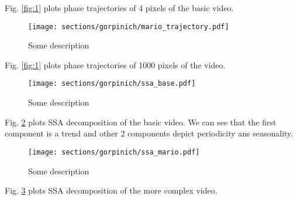 \documentclass[../../main.tex]{subfiles}
\begin{document}
Fig. \ref{fig:1} plots phase trajectories of 4 pixels of the basic video.

\begin{figure}[h!]
\centering
\texttt{[image: sections/gorpinich/mario\_trajectory.pdf]}
\caption{Some description}
\label{fig:2}
\end{figure}

Fig. \ref{fig:1} plots phase trajectories of 1000 pixels of the video.

\begin{figure}[h!]
\centering
\texttt{[image: sections/gorpinich/ssa\_base.pdf]}
\caption{Some description}
\label{fig:3}
\end{figure}

Fig. \ref{fig:3} plots SSA decomposition of the basic video. We can see that the first component is a trend and other 2 components depict periodicity ans seasonality.

\begin{figure}[h!]
\centering
\texttt{[image: sections/gorpinich/ssa\_mario.pdf]}
\caption{Some description}
\label{fig:4}
\end{figure}

Fig. \ref{fig:4} plots SSA decomposition of the more complex video.
\end{document}
